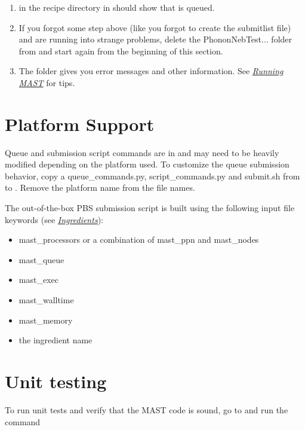 \documentclass[letterpaper,10pt,english]{sphinxmanual}
\begin{document}
\begin{enumerate}
\item {} 
 in the recipe directory in  should show that  is queued.

\item {} 
If you forgot some step above (like you forgot to create the submitlist file) and are running into strange problems, delete the PhononNebTest... folder from  and start again from the beginning of this section.

\item {} 
The  folder gives you error messages and other information. See {\hyperref[5_0_runningmast::doc]{\emph{Running MAST}}} for tips.

\end{enumerate}


\section{Platform Support}
\label{1_0_installation:platforms}\label{1_0_installation:platform-support}
Queue and submission script commands are in  and may need to be heavily modified depending on the platform used.
To customize the queue submission behavior, copy a queue\_commands.py, script\_commands.py and submit.sh from  to . Remove the platform name from the file names.

The out-of-the-box PBS submission script is built using the following input file keywords (see {\hyperref[2_0_ingredients::doc]{\emph{Ingredients}}}):
\begin{itemize}
\item {} 
mast\_processors or a combination of mast\_ppn and mast\_nodes

\item {} 
mast\_queue

\item {} 
mast\_exec

\item {} 
mast\_walltime

\item {} 
mast\_memory

\item {} 
the ingredient name

\end{itemize}


\section{Unit testing}
\label{1_0_installation:unit-testing}
To run unit tests and verify that the MAST code is sound, go to
 and run the command
\end{document}
